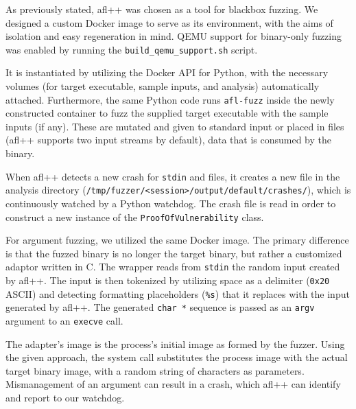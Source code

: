 \documentclass[../main.tex]{subfiles}
\begin{document}
As previously stated, afl++ was chosen as a tool for blackbox fuzzing.
We designed a custom Docker image to serve as its environment, with the
aims of isolation and easy regeneration in mind. QEMU support for
binary-only fuzzing was enabled by running the
\texttt{build\_qemu\_support.sh} script.

It is instantiated by utilizing the Docker API for Python, with the
necessary volumes (for target executable, sample inputs, and analysis)
automatically attached. Furthermore, the same Python code runs
\texttt{afl-fuzz} inside the newly constructed container to fuzz the
supplied target executable with the sample inputs (if any). These are
mutated and given to standard input or placed in files (afl++ supports
two input streams by default), data that is consumed by the binary.

When afl++ detects a new crash for \texttt{stdin} and files, it creates
a new file in the analysis directory
(\texttt{/tmp/fuzzer/<session>/output/default/crashes/}),
which is continuously watched by a Python watchdog. The crash file is
read in order to construct a new instance of the
\texttt{ProofOfVulnerability} class.

For argument fuzzing, we utilized the same Docker image. The primary
difference is that the fuzzed binary is no longer the target binary, but
rather a customized adaptor written in C. The wrapper reads from
\texttt{stdin} the random input created by afl++. The input is then
tokenized by utilizing space as a delimiter (\texttt{0x20} ASCII) and
detecting formatting placeholders (\texttt{\%s}) that it replaces with
the input generated by afl++. The generated \texttt{char\ *} sequence is
passed as an \texttt{argv} argument to an \texttt{execve} call.

The adapter's image is the process's initial image as formed by the
fuzzer. Using the given approach, the system call substitutes the process
image with the actual target binary image, with a random string of
characters as parameters. Mismanagement of an argument can result in a
crash, which afl++ can identify and report to our watchdog.
\end{document}
